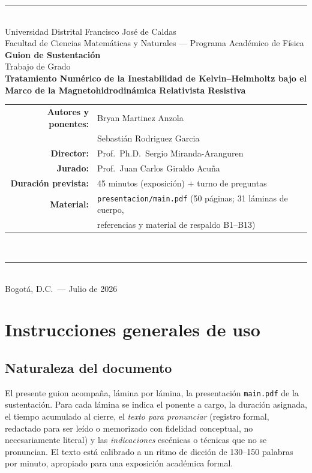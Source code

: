 \documentclass[11pt,letterpaper]{article}
\begin{document}
\begin{titlepage}
\centering
\vspace*{1.2cm}
{\color{primary}\rule{\linewidth}{2pt}}\\[0.9cm]
{\large Universidad Distrital Francisco José de Caldas}\\[2pt]
{\small Facultad de Ciencias Matemáticas y Naturales --- Programa Académico de Física}\\[1.6cm]
{\LARGE\bfseries Guion de Sustentación}\\[0.5cm]
{\large Trabajo de Grado}\\[0.9cm]
{\color{primary}\Large\bfseries Tratamiento Numérico de la Inestabilidad de
Kelvin--Helmholtz bajo el Marco de la Magnetohidrodinámica Relativista
Resistiva}\\[1.4cm]
\begin{tabular}{rl}
\textbf{Autores y ponentes:} & Bryan Martinez Anzola\\
                             & Sebastián Rodriguez Garcia\\[6pt]
\textbf{Director:}           & Prof.\ Ph.D.\ Sergio Miranda-Aranguren\\[6pt]
\textbf{Jurado:}             & Prof.\ Juan Carlos Giraldo Acuña\\[6pt]
\textbf{Duración prevista:}  & 45 minutos (exposición) $+$ turno de preguntas\\[6pt]
\textbf{Material:}           & \texttt{presentacion/main.pdf} (50 páginas;
                               31 láminas de cuerpo,\\
                             & referencias y material de respaldo B1--B13)\\
\end{tabular}\\[1.6cm]
{\color{primary}\rule{\linewidth}{2pt}}\\[0.8cm]
{\small Bogotá, D.C.\ --- Julio de 2026}
\vfill
\end{titlepage}

\tableofcontents
\newpage

\section{Instrucciones generales de uso}

\subsection{Naturaleza del documento}
El presente guion acompaña, lámina por lámina, la presentación
\texttt{main.pdf} de la sustentación. Para cada lámina se indica el ponente a
cargo, la duración asignada, el tiempo acumulado al cierre, el \emph{texto
para pronunciar} (registro formal, redactado para ser leído o memorizado con
fidelidad conceptual, no necesariamente literal) y las \emph{indicaciones}
escénicas o técnicas que no se pronuncian. El texto está calibrado a un ritmo
de dicción de 130--150 palabras por minuto, apropiado para una exposición
académica formal.
\end{document}
